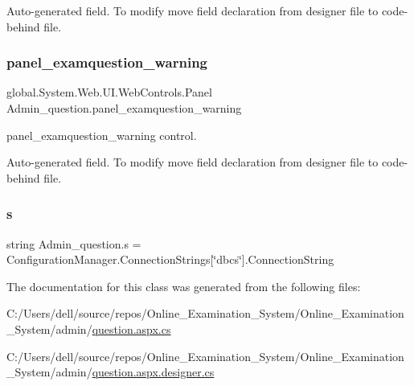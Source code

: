 Auto-\/generated field. To modify move field declaration from designer file to code-\/behind file. \mbox{\label{class_admin__question_a84f1baacf0c95b2403bd55e55d1c0ad2}} 
\subsubsection{\texorpdfstring{panel\_examquestion\_warning}{panel\_examquestion\_warning}}
{\footnotesize\ttfamily global.\+System.\+Web.\+U\+I.\+Web\+Controls.\+Panel Admin\+\_\+question.\+panel\+\_\+examquestion\+\_\+warning\hspace{0.3cm}{\ttfamily [protected]}}



panel\+\_\+examquestion\+\_\+warning control. 

Auto-\/generated field. To modify move field declaration from designer file to code-\/behind file. \mbox{\label{class_admin__question_ae58120e159e5c575bcfe0f8d75878c12}} 
\subsubsection{\texorpdfstring{s}{s}}
{\footnotesize\ttfamily string Admin\+\_\+question.\+s = Configuration\+Manager.\+Connection\+Strings\mbox{[}\char`\"{}dbcs\char`\"{}\mbox{]}.Connection\+String\hspace{0.3cm}{\ttfamily [private]}}



The documentation for this class was generated from the following files\+:\begin{DoxyCompactItemize}
\item 
C\+:/\+Users/dell/source/repos/\+Online\+\_\+\+Examination\+\_\+\+System/\+Online\+\_\+\+Examination\+\_\+\+System/admin/\mbox{\hyperlink{admin_2question_8aspx_8cs}{question.\+aspx.\+cs}}\item 
C\+:/\+Users/dell/source/repos/\+Online\+\_\+\+Examination\+\_\+\+System/\+Online\+\_\+\+Examination\+\_\+\+System/admin/\mbox{\hyperlink{admin_2question_8aspx_8designer_8cs}{question.\+aspx.\+designer.\+cs}}\end{DoxyCompactItemize}
